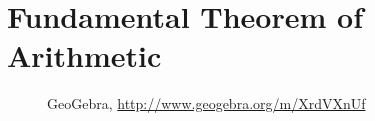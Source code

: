 \section{{Fundamental Theorem of Arithmetic}}
\begin{figure}[H]
\begin{center}
\caption*{GeoGebra, \url{http://www.geogebra.org/m/XrdVXnUf}}
\end{center}
\end{figure}

